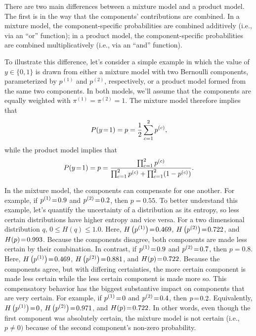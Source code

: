 \documentclass[10pt,english,oneside]{article}
\begin{document}
There are two main differences between a mixture model and a product
model. The first is in the way that the components' contributions are
combined. In a mixture model, the component-specific probabilities are
combined additively (i.e., via an ``or'' function); in a product
model, the component-specific probabilities are combined
multiplicatively (i.e., via an ``and'' function).

To illustrate this difference, let's consider a simple example in
which the value of $y \in \{0, 1\}$ is drawn from either a mixture
model with two Bernoulli components, parameterized by $p^{(1)}$ and
$p^{(2)}$, respectively, or a product model formed from the same two
components. In both models, we'll assume that the components are
equally weighted with $\pi^{(1)} = \pi^{(2)} = 1$. The mixture model
therefore implies that
\begin{equation}
  P(y \!=\! 1) = p = \frac{1}{2} \sum_{c=1}^2 p^{(c)},
  \end{equation}
while the product model implies that
\begin{equation}
P(y \!=\! 1) = p = \frac{\prod_{c=1}^2 p^{(c)}}{\prod_{c=1}^2 p^{(c)} +
  \prod_{c=1}^2 (1-p^{(c)})}.
\end{equation}

In the mixture model, the components can compensate for one
another. For example, if $p^{(1)} \!=\! 0.9$ and $p^{(2)} \!=\! 0.2$,
then $p = 0.55$. To better understand this example, let's quantify the
uncertainty of a distribution as its entropy, so less certain
distributions have higher entropy and vice versa. For a two
dimensional distribution $q$, $0 \leq H(q) \leq 1.0$. Here, $H\left(
p^{(1)} \right) \!=\! 0.469$, $H\left( p^{(2)} \right) \!=\! 0.722$, and
$H(p) \!=\! 0.993$. Because the components disagree, both components
are made less certain by their combination. In contrast, if $p^{(1)}
\!=\! 0.9$ and $p^{(2)} \!=\! 0.7$, then $p = 0.8$. Here, $H\left(
p^{(1)} \right) \!=\! 0.469$, $H\left( p^{(2)} \right) \!=\! 0.881$, and
$H(p) \!=\! 0.722$. Because the components agree, but with differing
certainties, the more certain component is made less certain while the
less certain component is made more so. This compensatory behavior has
the biggest substantive impact on components that are very
certain. For example, if $p^{(1)} \!=\! 0$ and $p^{(2)} \!=\! 0.4$, then
$p \!=\! 0.2$. Equivalently, $H\left(p^{(1)}\right) \!=\! 0$, $H\left(
p^{(2)} \right) \!=\! 0.971$, and $H(p) \!=\! 0.722$. In other words,
even though the first component was absolutely certain, the mixture
model is not certain (i.e., $p \neq 0)$ because of the second
component's non-zero probability.
\end{document}
